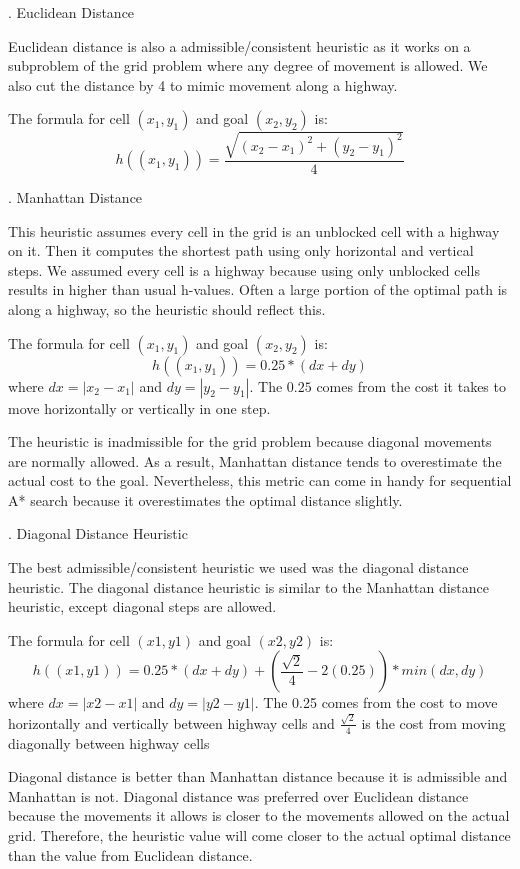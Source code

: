 \documentclass[12pt, letterpaper]{article}
\begin{document}
. Euclidean Distance

Euclidean distance is also a admissible/consistent heuristic as it works on a subproblem of the grid problem where any degree of movement is allowed. We also cut the distance by 4 to mimic movement along a highway.

The formula for cell $(x_1, y_1)$ and goal $(x_2, y_2)$ is:
$$h((x_1,y_1)) = \frac{\sqrt{(x_2-x_1)^2 + (y_2-y_1)^2}}{4}$$

\bigskip
{}. Manhattan Distance

This heuristic assumes every cell in the grid is an unblocked cell with a highway on it. Then it computes the shortest path using only horizontal and vertical steps. We assumed every cell is a highway because using only unblocked cells results in higher than usual h-values. Often a large portion of the optimal path is along a highway, so the heuristic should reflect this.

The formula for cell $(x_1, y_1)$ and goal $(x_2, y_2)$ is:
$$h((x_1, y_1)) = 0.25 * (dx + dy)$$
where $dx = |x_2 - x_1|$ and $dy = |y_2 - y_1|$. The $0.25$ comes from the cost it takes to move horizontally or vertically in one step.

The heuristic is inadmissible for the grid problem because diagonal movements are normally allowed. As a result, Manhattan distance tends to overestimate the actual cost to the goal. Nevertheless, this metric can come in handy for sequential A* search because it overestimates the optimal distance slightly.

\bigskip
{}. Diagonal Distance Heuristic

The best admissible/consistent heuristic we used was the diagonal distance heuristic. The diagonal distance heuristic is similar to the Manhattan distance heuristic, except diagonal steps are allowed. 

The formula for cell $(x1,y1)$ and goal $(x2, y2)$ is:
$$h((x1, y1)) = 0.25 * (dx + dy) +  (\frac{\sqrt{2}}{4} - 2(0.25)) * min(dx, dy)$$
where $dx = |x2 - x1|$ and $dy = |y2 - y1|$. The 0.25 comes from the cost to move horizontally and vertically between highway cells and $\frac{\sqrt{2}}{4}$ is the cost from moving diagonally between highway cells

Diagonal distance is better than Manhattan distance because it is admissible and Manhattan is not. Diagonal distance was preferred over Euclidean distance because the movements it allows is closer to the movements allowed on the actual grid. Therefore, the heuristic value will come closer to the actual optimal distance than the value from Euclidean distance.
\end{document}
